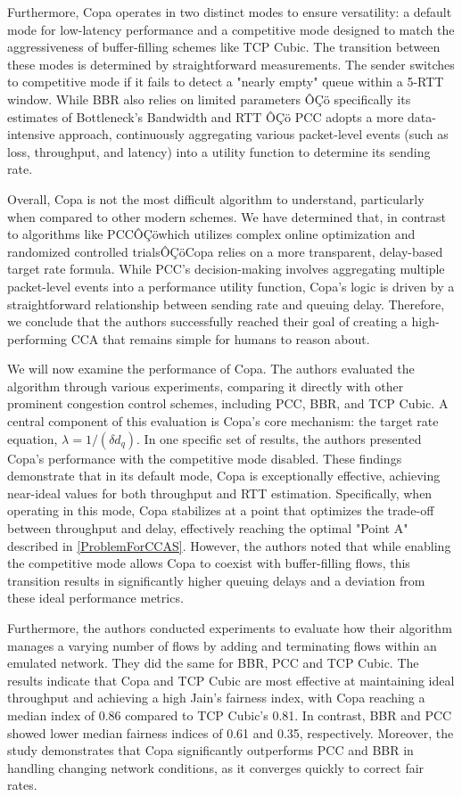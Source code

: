 \documentclass[conference]{IEEEtran}
\begin{document}
Furthermore, Copa operates in two distinct modes to ensure versatility: a default mode for low-latency performance and a competitive mode designed to match the aggressiveness of buffer-filling schemes like TCP Cubic. 
The transition between these modes is determined by straightforward measurements.
The sender switches to competitive mode if it fails to detect a "nearly empty" queue within a 5-RTT window. 
While BBR also relies on limited parameters ÔÇö specifically its estimates of Bottleneck's Bandwidth and RTT ÔÇö PCC adopts a more data-intensive approach, continuously aggregating various packet-level events (such as loss, throughput, and latency) into a utility function to determine its sending rate.

Overall, Copa is not the most difficult algorithm to understand, particularly when compared to other modern schemes. 
We have determined that, in contrast to algorithms like PCCÔÇöwhich utilizes complex online optimization and randomized controlled trialsÔÇöCopa relies on a more transparent, delay-based target rate formula. 
While PCC's decision-making involves aggregating multiple packet-level events into a performance utility function, Copa's logic is driven by a straightforward relationship between sending rate and queuing delay. 
Therefore, we conclude that the authors successfully reached their goal of creating a high-performing \acs{CCA} that remains simple for humans to reason about.

We will now examine the performance of Copa. 
The authors evaluated the algorithm through various experiments, comparing it directly with other prominent congestion control schemes, including PCC, BBR, and TCP Cubic. 
A central component of this evaluation is Copa's core mechanism: the target rate equation, $\lambda = 1/(\delta d_q)$.  
In one specific set of results, the authors presented Copa's performance with the competitive mode disabled. 
These findings demonstrate that in its default mode, Copa is exceptionally effective, achieving near-ideal values for both throughput and RTT estimation. 
Specifically, when operating in this mode, Copa stabilizes at a point that optimizes the trade-off between throughput and delay, effectively reaching the optimal "Point A" described in \ref{ProblemForCCAS}. 
However, the authors noted that while enabling the competitive mode allows Copa to coexist with buffer-filling flows, this transition results in significantly higher queuing delays and a deviation from these ideal performance metrics.

Furthermore, the authors conducted experiments to evaluate how their algorithm manages a varying number of flows by adding and terminating flows within an emulated network. 
They did the same for BBR, PCC and TCP Cubic.
The results indicate that Copa and TCP Cubic are most effective at maintaining ideal throughput and achieving a high Jain's fairness index, with Copa reaching a median index of 0.86 compared to TCP Cubic's 0.81. 
In contrast, BBR and PCC showed lower median fairness indices of 0.61 and 0.35, respectively. 
Moreover, the study demonstrates that Copa significantly outperforms PCC and BBR in handling changing network conditions, as it converges quickly to correct fair rates.
\end{document}
